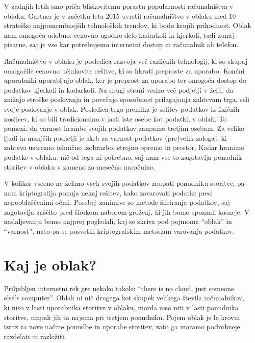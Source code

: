 \documentclass[12pt,a4paper,openany,tikz]{book}
\theoremstyle{plain}
\theoremstyle{definition}
\begin{document}
V zadnjih letih smo priča bliskovitemu porastu popularnosti računalništva v oblaku. Gartner je v začetku leta 2015 uvrstil računalništvo v oblaku med 10 strateško najpomembnejših tehnoloških trendov, ki bodo krojili prihodnost. Oblak nam omogoča udobno, cenovno ugodno delo kadarkoli in kjerkoli, tudi zunaj pisarne, saj je vse kar potrebujemo internetni dostop in računalnik ali telefon.

Računalništvo v oblaku je posledica razvoja več različnih tehnologij, ki so skupaj omogočile cenovno učinkovite rešitve, ki so hkrati preproste za uporabo. Končni uporabniki uporabljajo oblak, ker je preprost za uporabo ter omogoča dostop do podatkov kjerkoli in kadarkoli. Na drugi strani vedno več podjetji v želji, da znižajo stroške poslovanja in povečajo sposobnost prilagajanja zahtevam trga, seli svoje poslovanje v oblak. Posledica tega premika je selitev podatkov iz fizičnih nosilcev, ki so bili tradicionalno v lasti iste osebe kot podatki, v oblak. To pomeni, da varnost hrambe svojih podatkov zaupamo tretjim osebam. Za veliko ljudi in manjših podjetji je skrb za varnost podatkov (pre)velik zalogaj, ki zahteva ustrezno tehnično izobrazbo, strojno opremo in prostor. Kadar hranimo podatke v oblaku, nič od tega ni potrebno, saj nam vse to zagotavlja ponudnik storitev v oblaku v zameno za mesečno naročnino.

V kolikor vseeno ne želimo vseh svojih podatkov zaupati ponudniku storitve, pa nam kriptografija ponuja nekaj rešitev, kako zavarovati podatke pred nepooblaščenimi očmi. Posebej zanimive so metode šifriranja podatkov, saj zagotavlja zaščito pred širokom naborom groženj, ki jih bomo spoznali kasneje.  V nadaljevanju bomo najprej pogledali, kaj se skriva pod pojmoma ``oblak'' in ``varnost'', nato pa se posvetili kriptografskim metodam varovanja podatkov.

\section{Kaj je oblak?}
\label{sec:Kaj je oblak?}


Priljubljen internetni rek gre nekako takole: “there is no cloud, just someone else's computer”. Oblak ni nič drugega kot skupek velikega števila računalnikov, ki niso v lasti uporabnika storitve v oblaku, morda niso niti v lasti ponudnika storitve, ampak jih ta najema pri tretjem ponudniku. Pojem oblak je le krovni izraz za nove načine ponudbe in uporabe storitev, zato ga moramo podrobneje razdelati in razložiti.
\end{document}
